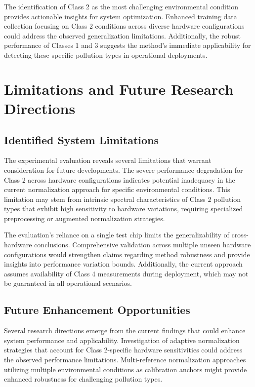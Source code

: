 The identification of Class 2 as the most challenging environmental condition provides actionable insights for system optimization. Enhanced training data collection focusing on Class 2 conditions across diverse hardware configurations could address the observed generalization limitations. Additionally, the robust performance of Classes 1 and 3 suggests the method's immediate applicability for detecting these specific pollution types in operational deployments.

\section{Limitations and Future Research Directions}

\subsection{Identified System Limitations}

The experimental evaluation reveals several limitations that warrant consideration for future developments. The severe performance degradation for Class 2 across hardware configurations indicates potential inadequacy in the current normalization approach for specific environmental conditions. This limitation may stem from intrinsic spectral characteristics of Class 2 pollution types that exhibit high sensitivity to hardware variations, requiring specialized preprocessing or augmented normalization strategies.

The evaluation's reliance on a single test chip limits the generalizability of cross-hardware conclusions. Comprehensive validation across multiple unseen hardware configurations would strengthen claims regarding method robustness and provide insights into performance variation bounds. Additionally, the current approach assumes availability of Class 4 measurements during deployment, which may not be guaranteed in all operational scenarios.

\subsection{Future Enhancement Opportunities}

Several research directions emerge from the current findings that could enhance system performance and applicability. Investigation of adaptive normalization strategies that account for Class 2-specific hardware sensitivities could address the observed performance limitations. Multi-reference normalization approaches utilizing multiple environmental conditions as calibration anchors might provide enhanced robustness for challenging pollution types.

